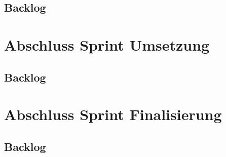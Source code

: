 \subsection{Backlog}

\section{Abschluss Sprint Umsetzung}
\subsection{Backlog}

\section{Abschluss Sprint Finalisierung}
\subsection{Backlog}


